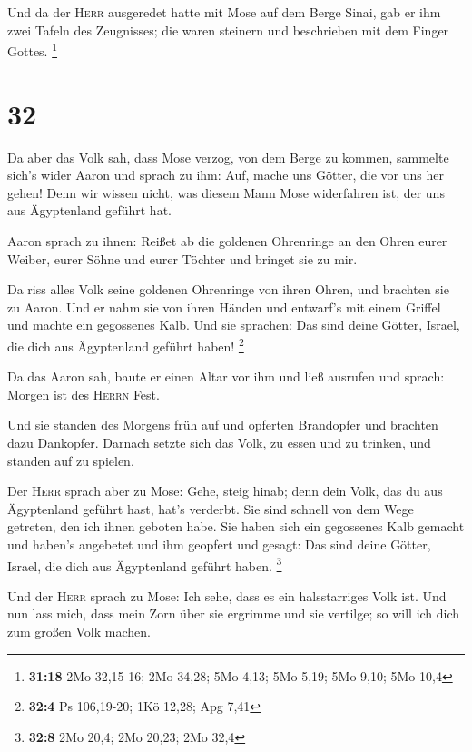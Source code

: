  Und da der \textsc{Herr} ausgeredet hatte mit Mose auf
dem Berge Sinai, gab er ihm zwei Tafeln des Zeugnisses; die waren
steinern und beschrieben mit dem Finger Gottes. \footnote{\textbf{31:18}
  2Mo 32,15-16; 2Mo 34,28; 5Mo 4,13; 5Mo 5,19; 5Mo 9,10; 5Mo 10,4}

\hypertarget{section-8}{%
\section{32}\label{section-8}}

 Da aber das Volk sah, dass Mose verzog, von dem Berge zu
kommen, sammelte sich's wider Aaron und sprach zu ihm: Auf, mache uns
Götter, die vor uns her gehen! Denn wir wissen nicht, was diesem Mann
Mose widerfahren ist, der uns aus Ägyptenland geführt hat.

 Aaron sprach zu ihnen: Reißet ab die goldenen Ohrenringe
an den Ohren eurer Weiber, eurer Söhne und eurer Töchter und bringet sie
zu mir.

 Da riss alles Volk seine goldenen Ohrenringe von ihren
Ohren, und brachten sie zu Aaron.  Und er nahm sie von
ihren Händen und entwarf's mit einem Griffel und machte ein gegossenes
Kalb. Und sie sprachen: Das sind deine Götter, Israel, die dich aus
Ägyptenland geführt haben! \footnote{\textbf{32:4} Ps 106,19-20; 1Kö
  12,28; Apg 7,41}

 Da das Aaron sah, baute er einen Altar vor ihm und ließ
ausrufen und sprach: Morgen ist des \textsc{Herrn} Fest.

 Und sie standen des Morgens früh auf und opferten
Brandopfer und brachten dazu Dankopfer. Darnach setzte sich das Volk, zu
essen und zu trinken, und standen auf zu spielen.

 Der \textsc{Herr} sprach aber zu Mose: Gehe, steig hinab;
denn dein Volk, das du aus Ägyptenland geführt hast, hat's verderbt.
 Sie sind schnell von dem Wege getreten, den ich ihnen
geboten habe. Sie haben sich ein gegossenes Kalb gemacht und haben's
angebetet und ihm geopfert und gesagt: Das sind deine Götter, Israel,
die dich aus Ägyptenland geführt haben. \footnote{\textbf{32:8} 2Mo
  20,4; 2Mo 20,23; 2Mo 32,4}

 Und der \textsc{Herr} sprach zu Mose: Ich sehe, dass es
ein halsstarriges Volk ist.  Und nun lass mich, dass mein
Zorn über sie ergrimme und sie vertilge; so will ich dich zum großen
Volk machen.

